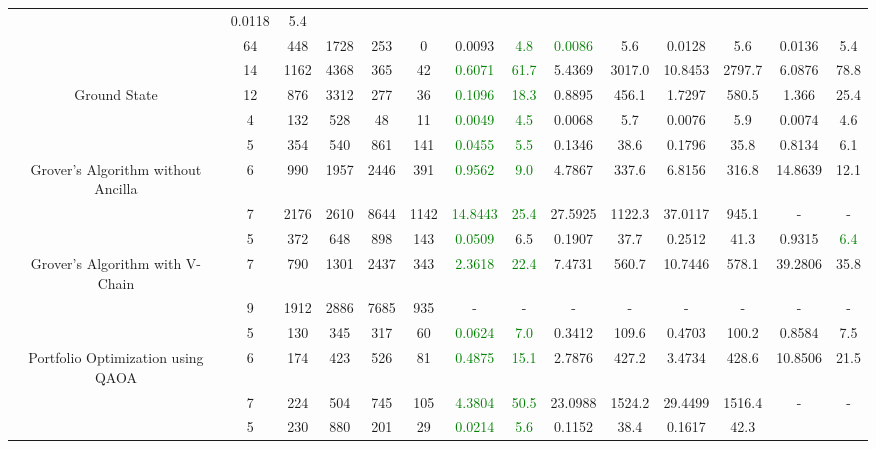 \begin{table}[htb]
{\begin{tabular}{|c|c|c|c|c|c|c|c|c|c|c|c|c|c|}
 & 0.0118 & 5.4
 \\
 & 
64 & 448 & 1728 & 253 & 0
 & 0.0093 & \textcolor{green}{4.8}
 & \textcolor{green}{0.0086} & 5.6
 & 0.0128 & 5.6
 & 0.0136 & 5.4
 \\
\hline
 & 
14 & 1162 & 4368 & 365 & 42
 & \textcolor{green}{0.6071} & \textcolor{green}{61.7}
 & 5.4369 & 3017.0
 & 10.8453 & 2797.7
 & 6.0876 & 78.8
 \\
Ground State & 
12 & 876 & 3312 & 277 & 36
 & \textcolor{green}{0.1096} & \textcolor{green}{18.3}
 & 0.8895 & 456.1
 & 1.7297 & 580.5
 & 1.366 & 25.4
 \\
 & 
4 & 132 & 528 & 48 & 11
 & \textcolor{green}{0.0049} & \textcolor{green}{4.5}
 & 0.0068 & 5.7
 & 0.0076 & 5.9
 & 0.0074 & 4.6
 \\
\hline
 & 
5 & 354 & 540 & 861 & 141
 & \textcolor{green}{0.0455} & \textcolor{green}{5.5}
 & 0.1346 & 38.6
 & 0.1796 & 35.8
 & 0.8134 & 6.1
 \\
Grover's Algorithm without Ancilla & 
6 & 990 & 1957 & 2446 & 391
 & \textcolor{green}{0.9562} & \textcolor{green}{9.0}
 & 4.7867 & 337.6
 & 6.8156 & 316.8
 & 14.8639 & 12.1
 \\
 & 
7 & 2176 & 2610 & 8644 & 1142
 & \textcolor{green}{14.8443} & \textcolor{green}{25.4}
 & 27.5925 & 1122.3
 & 37.0117 & 945.1
 & - & -
 \\
\hline
 & 
5 & 372 & 648 & 898 & 143
 & \textcolor{green}{0.0509} & 6.5
 & 0.1907 & 37.7
 & 0.2512 & 41.3
 & 0.9315 & \textcolor{green}{6.4}
 \\
Grover's Algorithm with V-Chain & 
7 & 790 & 1301 & 2437 & 343
 & \textcolor{green}{2.3618} & \textcolor{green}{22.4}
 & 7.4731 & 560.7
 & 10.7446 & 578.1
 & 39.2806 & 35.8
 \\
 & 
9 & 1912 & 2886 & 7685 & 935
 & - & -
 & - & -
 & - & -
 & - & -
 \\
\hline
 & 
5 & 130 & 345 & 317 & 60
 & \textcolor{green}{0.0624} & \textcolor{green}{7.0}
 & 0.3412 & 109.6
 & 0.4703 & 100.2
 & 0.8584 & 7.5
 \\
Portfolio Optimization using QAOA & 
6 & 174 & 423 & 526 & 81
 & \textcolor{green}{0.4875} & \textcolor{green}{15.1}
 & 2.7876 & 427.2
 & 3.4734 & 428.6
 & 10.8506 & 21.5
 \\
 & 
7 & 224 & 504 & 745 & 105
 & \textcolor{green}{4.3804} & \textcolor{green}{50.5}
 & 23.0988 & 1524.2
 & 29.4499 & 1516.4
 & - & -
 \\
\hline
 & 
5 & 230 & 880 & 201 & 29
 & \textcolor{green}{0.0214} & \textcolor{green}{5.6}
 & 0.1152 & 38.4
 & 0.1617 & 42.3

\end{tabular}}
\end{table}
